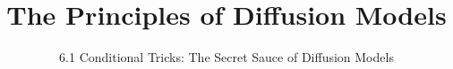 ﻿%

\graphicspath{{../images/}}
\title{The Principles of Diffusion Models}
\subtitle{6.1 Conditional Tricks: The Secret Sauce of Diffusion Models}


\begin{frame}
    \titlepage
\end{frame}



